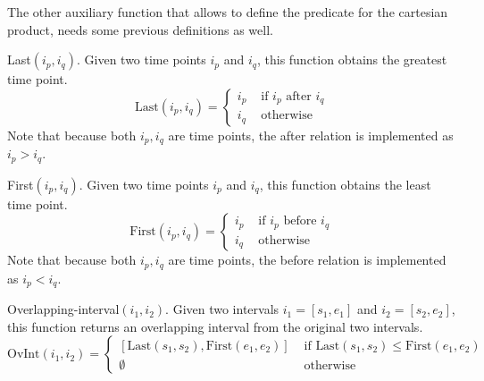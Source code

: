 The other auxiliary function that allows to define the predicate for the cartesian product, needs some previous definitions as well. 

\begin{definition}
 \label{def:crisp-last}
Last$\left(i_p, i_q \right)$. Given two time points $i_p$ and $i_q$, this function obtains the greatest time point.
\begin{equation}
 \label{eq:last-crisp}
\mbox{Last}\left(i_p, i_q \right) = 
\begin{cases}
i_p & \mbox{ if } i_p \mbox{ after } i_q \\
i_q & \mbox{ otherwise } 
\end{cases}
\end{equation}
Note that because both $i_p, i_q$ are time points, the after relation is implemented as $i_p > i_q$.
\end{definition}

\begin{definition}
 \label{def:crisp-first}
First$\left(i_p, i_q \right)$. Given two time points $i_p$ and $i_q$, this function obtains the least time point.
\begin{equation}
 \label{eq:first-crisp}
\mbox{First}\left(i_p, i_q \right) =
\begin{cases}
i_p & \mbox{ if } i_p \mbox{ before } i_q \\
i_q & \mbox{ otherwise } 
\end{cases}
\end{equation}
Note that because both $i_p, i_q$ are time points, the before relation is implemented as  $i_p < i_q$.
\end{definition}



\begin{definition}
 \label{def:crisp-overlapping-interval}
Overlapping-interval$\left(i_1, i_2 \right)$. Given two intervals $i_1 = \left[s_1, e_1 \right]$ and $i_2 = \left[s_2, e_2\right]$, this function returns an overlapping interval from the original two intervals.
\begin{equation}
 \label{eq:crisp-overlapping-interval}
\mbox{OvInt}\left(i_1, i_2 \right) = 
\begin{cases}
\left[\mbox{Last}\left( s_1, s_2 \right), \mbox{First}\left(e_1, e_2 \right) \right] & \mbox{ if } \mbox{Last}\left( s_1, s_2 \right) \leq \mbox{First}\left(e_1, e_2 \right) \\
\emptyset & \mbox{ otherwise } 
\end{cases}
\end{equation}
\end{definition}

